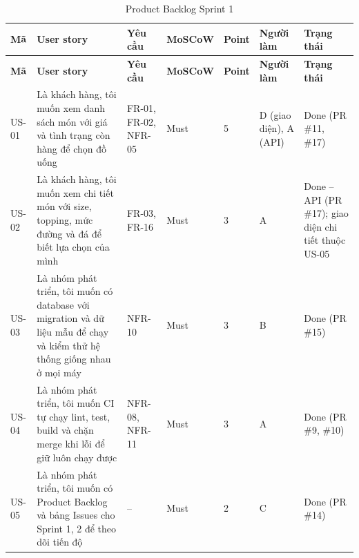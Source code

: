 {\footnotesize
\begin{longtable}{@{}L{1.1cm}L{4.3cm}L{1.7cm}L{1.6cm}L{0.9cm}L{1.7cm}L{2.6cm}@{}}
\caption{Product Backlog Sprint 1}\label{tab:backlogs1}\\
\toprule
\textbf{Mã} & \textbf{User story} & \textbf{Yêu cầu} & \textbf{MoSCoW} & \textbf{Point} & \textbf{Người làm} & \textbf{Trạng thái} \\ \midrule \endfirsthead
\toprule \textbf{Mã} & \textbf{User story} & \textbf{Yêu cầu} & \textbf{MoSCoW} & \textbf{Point} & \textbf{Người làm} & \textbf{Trạng thái} \\ \midrule \endhead
\bottomrule \endfoot
US-01 & Là khách hàng, tôi muốn xem danh sách món với giá và tình trạng còn hàng để chọn đồ uống & FR-01, FR-02, NFR-05 & Must & 5 & D (giao diện), A (API) & Done (PR \#11, \#17) \\
US-02 & Là khách hàng, tôi muốn xem chi tiết món với size, topping, mức đường và đá để biết lựa chọn của mình & FR-03, FR-16 & Must & 3 & A & Done -- API (PR \#17); giao diện chi tiết thuộc US-05 \\
US-03 & Là nhóm phát triển, tôi muốn có database với migration và dữ liệu mẫu để chạy và kiểm thử hệ thống giống nhau ở mọi máy & NFR-10 & Must & 3 & B & Done (PR \#15) \\
US-04 & Là nhóm phát triển, tôi muốn CI tự chạy lint, test, build và chặn merge khi lỗi để giữ  luôn chạy được & NFR-08, NFR-11 & Must & 3 & A & Done (PR \#9, \#10) \\
US-05 & Là nhóm phát triển, tôi muốn có Product Backlog và bảng Issues cho Sprint 1, 2 để theo dõi tiến độ & -- & Must & 2 & C & Done (PR \#14) \\
\end{longtable}
}